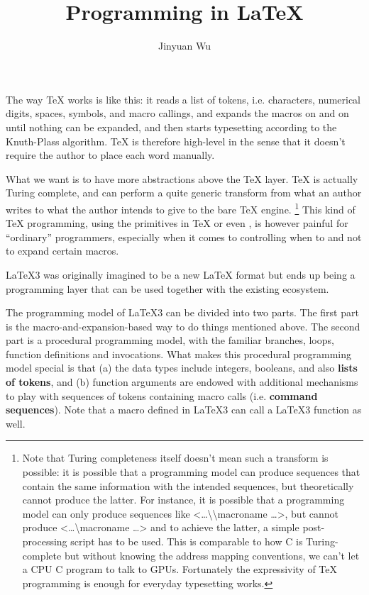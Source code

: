 \documentclass[hyperref, a4paper, 12pt]{article}
\title{Programming in LaTeX}
\author{Jinyuan Wu}
\newcommand*{\concept}[1]{{\textbf{#1}}}
\def\texttt#1{<#1>}%
\newcommand{\shortcode}[1]{\texttt{#1}}
\begin{document}
\maketitle


The way \TeX{} works is like this:
it reads a list of tokens, i.e. characters, numerical digits, spaces, symbols, and macro callings,
and expands the macros on and on until nothing can be expanded,
and then starts typesetting according to the Knuth-Plass algorithm.
\TeX{} is therefore high-level in the sense that it doesn't require the author
to place each word manually.

What we want is to have more abstractions above the \TeX{} layer.
\TeX{} is actually Turing complete, and can perform a quite generic transform from
what an author writes to what the author intends to give to the bare \TeX{} engine.%
\footnote{
    Note that Turing completeness itself doesn't mean such a transform is possible:
    it is possible that a programming model can produce sequences that contain the same information
    with the intended sequences,
    but theoretically cannot produce the latter.
    For instance, it is possible that a programming model can only produce sequences like 
    \shortcode{\dots \textbackslash \textbackslash macroname \dots},
    but cannot produce \shortcode{\dots \textbackslash macroname \dots}
    and to achieve the latter, a simple post-processing script has to be used.
    This is comparable to how C is Turing-complete but without knowing the address mapping conventions,
    we can't let a CPU C program to talk to GPUs.
    Fortunately the expressivity of \TeX{} programming is enough for everyday typesetting works.
}
This kind of \TeX{} programming, using the primitives in \TeX{} or even \LaTeXe,
is however painful for ``ordinary'' programmers,
especially when it comes to controlling when to and not to expand certain macros.

\LaTeX 3 was originally imagined to be a new \LaTeX{} format but ends up being a programming layer
that can be used together with the existing \LaTeXe{} ecosystem.

The programming model of \LaTeX 3 can be divided into two parts.
The first part is the macro-and-expansion-based way to do things mentioned above.
The second part is a procedural programming model,
with the familiar branches, loops, function definitions and invocations.
What makes this procedural programming model special 
is that (a) the data types include integers, booleans, and also \concept{lists of tokens},
and (b) function arguments are endowed with additional mechanisms to 
play with sequences of tokens containing macro calls (i.e. \concept{command sequences}).
Note that a macro defined in \LaTeX 3 can call a \LaTeX 3 function as well.
\end{document}
